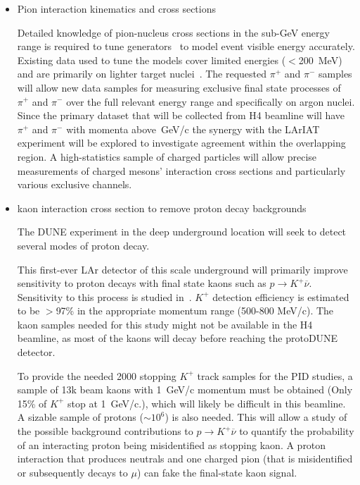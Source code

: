 \begin{itemize}
\item Pion interaction kinematics and cross sections

Detailed knowledge of pion-nucleus cross sections in the sub-GeV energy range is required to tune generators~\cite{genie} to model event visible energy accurately. 
Existing data used to tune the models cover limited energies ($<$200~MeV) and are primarily on lighter target nuclei~\cite{fsirev}.
The requested $\pi^+$ and $\pi^-$ samples will allow new data samples for measuring
exclusive final state processes of $\pi^+$ and $\pi^-$ over the full relevant energy range and specifically on argon nuclei. Since the primary dataset that will be collected from H4 beamline will have $\pi^+$ and $\pi^-$ with momenta above\, GeV/c the synergy with the LArIAT experiment will be explored to investigate agreement within the overlapping region.  A high-statistics sample of charged particles will allow precise measurements of charged mesons' interaction cross sections and particularly various exclusive channels.
\item kaon interaction cross section to remove proton decay backgrounds


The DUNE experiment in the deep underground location will seek to detect several modes of proton decay.

This first-ever LAr detector of this scale underground will primarily improve sensitivity to proton decays with final state kaons such as  ${p \rightarrow K^+ \overline{\nu}}$. 
Sensitivity to this process is studied in~\cite{bueno}. $K^+$ detection efficiency is estimated to be $>$97\% in the
appropriate momentum range (500-800 MeV/c). The kaon samples needed for this study might not be available in the H4 beamline, as most of the kaons will decay before reaching the protoDUNE detector. 

To provide the needed 2000 stopping $K^+$ track samples for the PID studies, a sample of 13k beam kaons with 1~GeV/c momentum must be obtained (Only 15\% of $K^+$ stop at 1~GeV/c.), which will likely be difficult in this beamline. 
A sizable sample of protons ($\sim 10^6$) is also needed. This will allow a study of the possible background contributions to $p \rightarrow K^+ \overline{\nu}$ to quantify the probability of an interacting proton being misidentified as stopping kaon. A proton interaction that produces neutrals and one charged pion 
(that is misidentified or subsequently decays to $\mu$) can fake the final-state kaon signal.



\end{itemize}
